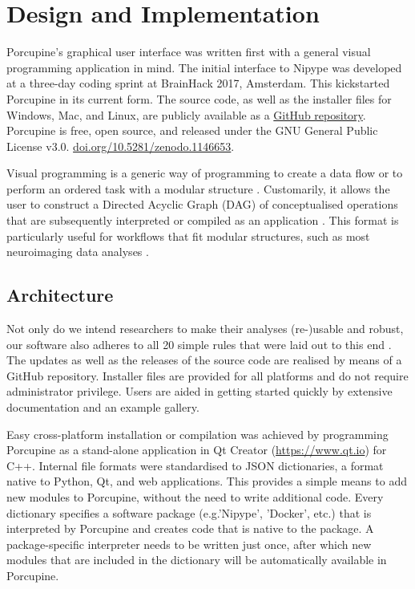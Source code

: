 \section{Design and Implementation}
Porcupine's graphical user interface was written first with a general visual programming application in mind. The initial interface to Nipype was developed at a three-day coding sprint at BrainHack 2017, Amsterdam. This kickstarted Porcupine in its current form. The source code, as well as the installer files for Windows, Mac, and Linux, are publicly available as a \href{https://github.com/TimVanMourik/Porcupine}{GitHub repository}. Porcupine is free, open source, and released under the GNU General Public License v3.0.  \url{doi.org/10.5281/zenodo.1146653}.

Visual programming is a generic way of programming to create a data flow or to perform an ordered task with a modular structure \cite{Myers1986}. Customarily, it allows the user to construct a Directed Acyclic Graph (DAG) \cite{Thulasiraman1992} of conceptualised operations that are subsequently interpreted or compiled as an application \cite{Myers1990}. This format is particularly useful for workflows that fit modular structures, such as most neuroimaging data analyses \cite{Rex2003}. 

\subsection{Architecture}
Not only do we intend researchers to make their analyses (re-)usable and robust, our software also adheres to all 20 simple rules that were laid out to this end \cite{List2017,Taschuk2017}. The updates as well as the releases of the source code are realised by means of a GitHub repository. Installer files are provided for all platforms and do not require administrator privilege. Users are aided in getting started quickly by extensive documentation and an example gallery.

Easy cross-platform installation or compilation was achieved by programming Porcupine as a stand-alone application in Qt Creator (\url{https://www.qt.io}) for C++. Internal file formats were standardised to JSON dictionaries, a format native to Python, Qt, and web applications. This provides a simple means to add new modules to Porcupine, without the need to write additional code. Every dictionary specifies a software package (e.g.'Nipype', 'Docker', etc.) that is interpreted by Porcupine and creates code that is native to the package. A package-specific interpreter needs to be written just once, after which new modules that are included in the dictionary will be automatically available in Porcupine.

